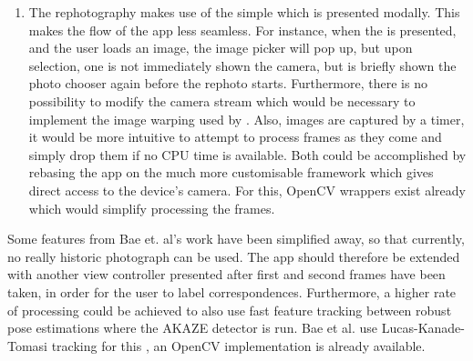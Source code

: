 \begin{enumerate}
   \item The rephotography makes use of the simple
       which is presented modally. This makes the
      flow of the app less seamless. For instance, when the
       is presented, and the user loads an image,
      the image picker will pop up, but upon selection, one is not immediately
      shown the camera, but is briefly shown the photo chooser again before the
      rephoto starts. Furthermore, there is no possibility to modify the camera
      stream which would be necessary to implement the image warping used by
      \citet{bae2010}. Also, images are captured by a timer, it would be more
      intuitive to attempt to process frames as they come and simply drop them
      if no CPU time is available. Both could be accomplished by rebasing the
      app on the much more customisable  framework which
      gives direct access to the device's camera. For this, OpenCV wrappers
      exist already which would simplify processing the frames.
\end{enumerate}

Some features from Bae et. al's work have been simplified away, so that
currently, no really historic photograph can be used. The app should therefore
be extended with another view controller presented after first and second frames
have been taken, in order for the user to label correspondences. Furthermore,
a higher rate of processing could be achieved to also use fast feature tracking
between robust pose estimations where the AKAZE detector is run. Bae et al. use
Lucas-Kanade-Tomasi tracking for this \citep{lucas1981,tomasi1991}, an
OpenCV implementation is already available. 
